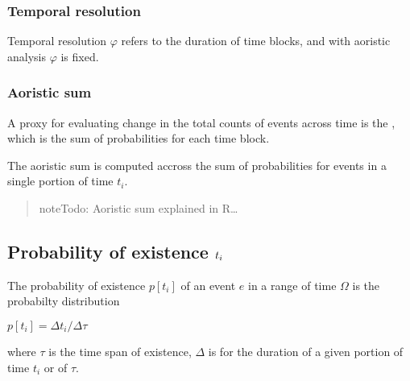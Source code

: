 \documentclass[a4paper,12pt,english]{sphinxhowto}
\begin{document}
\subsubsection{Temporal resolution}
\label{\detokenize{Uncertainty:temporal-resolution}}
Temporal resolution \(\varphi\) refers to the duration of time blocks, and
with aoristic analysis \(\varphi\) is fixed.


\subsubsection{Aoristic sum}
\label{\detokenize{Uncertainty:aoristic-sum}}
A proxy for evaluating change in the total counts of events across time is the , which is the sum of probabilities for each time block.

The aoristic sum is computed accross the sum of probabilities for events in a single portion of time \(t_i\).
\begin{quote}

\begin{sphinxVerbatim}[commandchars=\\\{\},formatcom=\footnotesize]
        
           
          
          
          
           
\end{sphinxVerbatim}

\begin{sphinxadmonition}{note}{\label{\detokenize{Uncertainty:id1}}Todo:}
Aoristic sum explained in R…
\end{sphinxadmonition}
\end{quote}



\subsection{Probability of existence \protect\(t_i\protect\)}
\label{\detokenize{Uncertainty:probability-of-existence-t-i}}
The probability of existence \(p[t_i]\) of an event \(e\) in a range of time \(\varOmega\) is the probabilty distribution

\(p[t_i] = \Delta t_i / \Delta \tau\)

where \(\tau\) is the time span of existence, \(\Delta\) is for the duration of a given portion of time \(t_i\) or of \(\tau\).
\end{document}

